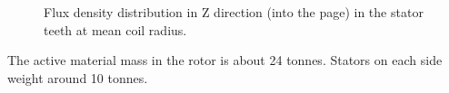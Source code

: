 \documentclass[12pt]{iopart}
\begin{document}
\begin{figure}[]
  \centering
  \hfill
   \caption{Flux density distribution in Z direction (into the page) in the stator teeth at mean coil radius.} 
    \label{10MW_tooth_Bz}
\end{figure}

The active material mass in the rotor is about 24 tonnes. Stators on each side weight around 10 tonnes.
\end{document}
